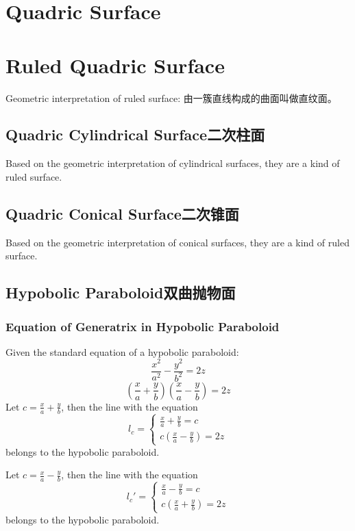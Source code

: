 \documentclass[onecolumn]{ctexart}
\begin{document}
\section{Quadric Surface}

\section{Ruled Quadric Surface}

Geometric interpretation of ruled surface: 由一簇直线构成的曲面叫做直纹面。

\subsection{Quadric Cylindrical Surface二次柱面}

Based on the geometric interpretation of cylindrical surfaces, they are a kind 
of ruled surface.

\subsection{Quadric Conical Surface二次锥面}

Based on the geometric interpretation of conical surfaces, they are a kind of 
ruled surface.

\subsection{Hypobolic Paraboloid双曲抛物面}

\subsubsection{Equation of Generatrix in Hypobolic Paraboloid}

Given the standard equation of a hypobolic paraboloid:
\begin{equation}
  \frac{x^2}{a^2} - \frac{y^2}{b^2} = 2z
\end{equation}
\[
  (\frac{x}{a} + \frac{y}{b})(\frac{x}{a} - \frac{y}{b}) = 2z
\]
Let $c = \frac{x}{a} + \frac{y}{b}$, then the line with the equation
\[
  l_c = 
  \begin{cases}
    \frac{x}{a} + \frac{y}{b} = c \\
    c(\frac{x}{a} - \frac{y}{b}) = 2z
  \end{cases}
\]
belongs to the hypobolic paraboloid.

Let $c = \frac{x}{a} - \frac{y}{b}$, then the line with the equation
\[
  l_c' = 
  \begin{cases}
    \frac{x}{a} - \frac{y}{b} = c \\
    c(\frac{x}{a} + \frac{y}{b}) = 2z
  \end{cases}
\]
belongs to the hypobolic paraboloid.
\end{document}
